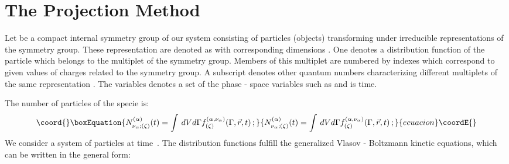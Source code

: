 \documentclass[a4paper,11pt]{article}
\begin{document}
\section{\normalsize\bf The Projection Method}\label{proj}
\noindent
 Let \coordHE{} be a compact internal symmetry group of our system
consisting  of particles (objects) transforming under irreducible
representations of the symmetry group. These representation are
denoted as \coordHE{} with corresponding dimensions \coordHE{}.
One denotes \coordHE{} a
distribution function of the particle which belongs to the
multiplet \coordHE{} of the symmetry group. Members of this
multiplet are numbered by indexes \coordHE{} which correspond to given values of
charges related to the symmetry group. A subscript \myHighlight{$\zeta$}\coordHE{} denotes
other quantum numbers characterizing different multiplets of the
same representation \myHighlight{$\alpha$}\coordHE{}.  The variables \coordHE{}
denotes a  set of the phase - space variables such as \myHighlight{$(\vec
p,\vec r)$}\coordHE{} and \myHighlight{$t$}\coordHE{} is time.

The number of particles of the specie
\myHighlight{$\{\alpha,\nu_\alpha,\zeta\}$}\coordHE{} is:
\begin{equation}\coord{}\boxEquation{
N^{(\alpha)}_{\nu_\alpha;(\zeta)}(t)=\int\,dV d\Gamma
f^{(\alpha,\nu_\alpha)}_{(\zeta)}(\Gamma,\vec r,t)\,; \label{numb}
}{
N^{(\alpha)}_{\nu_\alpha;(\zeta)}(t)=\int\,dV d\Gamma
f^{(\alpha,\nu_\alpha)}_{(\zeta)}(\Gamma,\vec r,t)\,; }{ecuacion}\coordE{}\end{equation}
We consider a system of
 \myHighlight{$\{N_{\alpha_1, \nu_{\alpha_1}}^{(\zeta_1)}(t),\dots,
{N_{\alpha_n,\nu_{\alpha_n}}^{(\zeta_n)}(t)}\}$}\coordHE{} particles at time
\myHighlight{$t$}\coordHE{}\,.  The distribution functions fulfill the generalized Vlasov
- Boltzmann kinetic equations, which can be written in the general
form:
\end{document}
